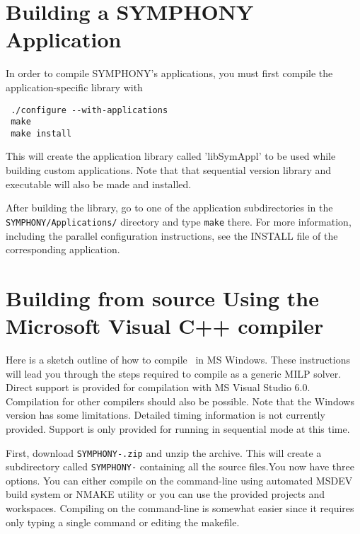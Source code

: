 \section{Building a SYMPHONY Application}
\label{build_appl}
In order to compile SYMPHONY's applications, you must first compile the 
application-specific library with
{\color{Brown}
\begin{verbatim}
 ./configure --with-applications 
 make 
 make install
\end{verbatim}
}
This will create the application library called 'libSymAppl' to be used while
building custom applications. Note that that sequential version library and
executable will also be made and installed.

After building the library, go to one of the application subdirectories in the
\texttt{SYMPHONY/Applications/} directory and type \texttt{make} there. For
more information, including the parallel configuration instructions, see the
INSTALL file of the corresponding application.

\section{Building from source Using the Microsoft Visual C++ compiler}
\label{getting_started_windows}

Here is a sketch outline of how to compile \BB\ in MS Windows.
These instructions will lead you through the steps required to compile
\BB as a generic MILP solver. Direct support
is provided for compilation with MS Visual Studio 6.0. Compilation for other
compilers should also be possible. Note that the Windows version has some
limitations. Detailed timing information is not currently provided. Support is
only provided for running in sequential mode at this time.

First, download \texttt{SYMPHONY-\VER.zip} and unzip the archive. This will
create a subdirectory called \texttt{SYMPHONY-\VER} containing all the source
files.You now 
have three options. You can either compile on the command-line using automated 
MSDEV build system or NMAKE utility or you can use the provided projects and 
workspaces. Compiling on the command-line is somewhat easier since it requires 
only typing a single command or editing the makefile. 

